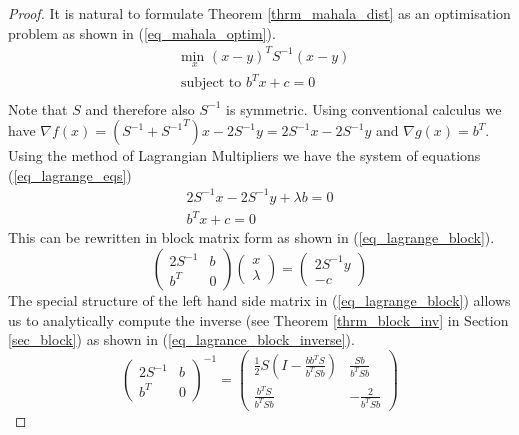 \begin{proof}
It is natural to formulate Theorem \ref{thrm_mahala_dist} as an optimisation problem as shown in (\ref{eq_mahala_optim}). \begin{equation}
\begin{aligned}
&\underset{x}{\text{min }} (x-y)^TS^{-1}(x-y)\\
& \text{subject to } b^Tx+c = 0\\
\end{aligned}
\label{eq_mahala_optim}
\end{equation}
Note that $S$ and therefore also $S^{-1}$ is symmetric. Using conventional calculus we have $\nabla f(x) = (S^{-1} + {S^{-1}}^T)x - 2S^{-1}y = 2S^{-1}x - 2S^{-1}y$ and $\nabla g(x) = b^T$. Using the method of Lagrangian Multipliers \cite{forst} we have the system of equations (\ref{eq_lagrange_eqs})
\begin{equation}
\begin{aligned}
2S^{-1}x - 2S^{-1}y + \lambda b = 0 \\
b^Tx+c = 0
\end{aligned}
\label{eq_lagrange_eqs}
\end{equation}
This can be rewritten in block matrix form as shown in (\ref{eq_lagrange_block}).
\begin{equation}
\begin{pmatrix}
2S^{-1} & b \\ b^T & 0
\end{pmatrix} \begin{pmatrix}
x \\ \lambda
\end{pmatrix} = \begin{pmatrix}
2S^{-1}y \\ -c
\end{pmatrix}
\label{eq_lagrange_block}
\end{equation}
The special structure of the left hand side matrix in (\ref{eq_lagrange_block}) allows us to analytically compute the inverse (see Theorem \ref{thrm_block_inv} in Section \ref{sec_block}) as shown in (\ref{eq_lagrance_block_inverse}).
\begin{equation}
\begin{pmatrix}
2S^{-1} & b \\ b^T & 0
\end{pmatrix}^{-1} = \begin{pmatrix}
\frac{1}{2}S(I-\frac{bb^TS}{b^TSb}) & \frac{Sb}{b^TSb} \\ \frac{b^TS}{b^TSb} & -\frac{2}{b^TSb}

\end{pmatrix}
\end{equation}
\end{proof}
